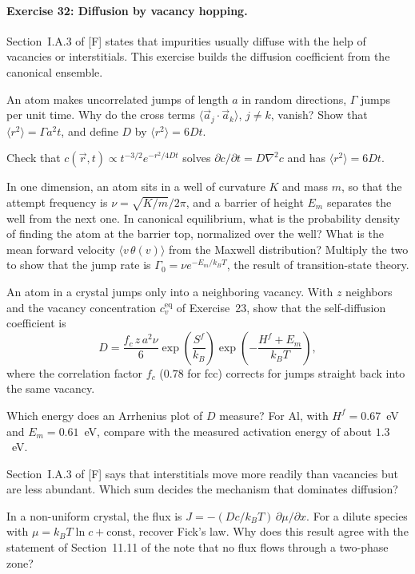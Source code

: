 \documentclass[11pt]{article}      %
\numberwithin{equation}{section}   %
\begin{document}
\paragraph{Exercise 32: Diffusion by vacancy hopping.}
Section~I.A.3 of [F] states that impurities usually diffuse with the help of vacancies or interstitials. This exercise builds the diffusion coefficient from the canonical ensemble.
\begin{parts}
    \item An atom makes uncorrelated jumps of length $a$ in random directions, $\Gamma$ jumps per unit time. Why do the cross terms $\langle\vec a_j\cdot\vec a_k\rangle$, $j \neq k$, vanish? Show that $\langle r^2\rangle = \Gamma a^2t$, and define $D$ by $\langle r^2\rangle = 6Dt$.
    \item Check that $c(\vec r, t) \propto t^{-3/2}e^{-r^2/4Dt}$ solves $\partial c/\partial t = D\nabla^2c$ and has $\langle r^2\rangle = 6Dt$.
    \item In one dimension, an atom sits in a well of curvature $K$ and mass $m$, so that the attempt frequency is $\nu = \sqrt{K/m}/2\pi$, and a barrier of height $E_m$ separates the well from the next one. In canonical equilibrium, what is the probability density of finding the atom at the barrier top, normalized over the well? What is the mean forward velocity $\langle v\,\theta(v)\rangle$ from the Maxwell distribution? Multiply the two to show that the jump rate is $\Gamma_0 = \nu e^{-E_m/k_BT}$, the result of transition-state theory.
    \item An atom in a crystal jumps only into a neighboring vacancy. With $z$ neighbors and the vacancy concentration $c_v^{\text{eq}}$ of Exercise~23, show that the self-diffusion coefficient is
    \begin{equation*}
        D = \frac{f_c\,z\,a^2\nu}{6}\exp\!\left(\frac{S^f}{k_B}\right)\exp\!\left(-\frac{H^f + E_m}{k_BT}\right),
    \end{equation*}
    where the correlation factor $f_c$ ($0.78$ for fcc) corrects for jumps straight back into the same vacancy.
    \item Which energy does an Arrhenius plot of $D$ measure? For Al, with $H^f = 0.67$~eV and $E_m = 0.61$~eV, compare with the measured activation energy of about $1.3$~eV.
    \item Section~I.A.3 of [F] says that interstitials move more readily than vacancies but are less abundant. Which sum decides the mechanism that dominates diffusion?
    \item In a non-uniform crystal, the flux is $J = -(Dc/k_BT)\,\partial\mu/\partial x$. For a dilute species with $\mu = k_BT\ln c + \text{const}$, recover Fick's law. Why does this result agree with the statement of Section~11.11 of the note that no flux flows through a two-phase zone?
\end{parts}
\end{document}
